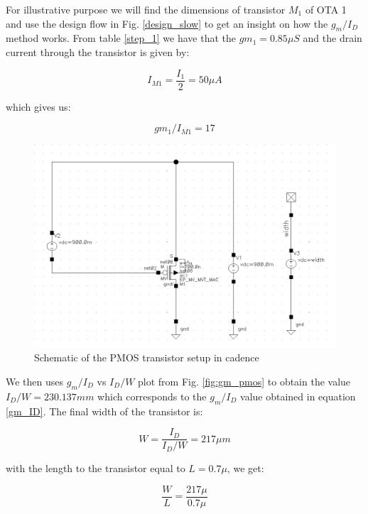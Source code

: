 For illustrative purpose we will find the dimensions of transistor $M_1$ of OTA 1 and use the design flow in Fig. \ref{design_slow} to get an insight on how the $g_m/I_D$ method works. From table \ref{step_1} we have that the $gm_1 = 0.85\mu S$ and the drain current through the transistor is given by:

\begin{equation}
    I_{M1} = \frac{I_1}{2} = 50\mu A
\end{equation}

which gives us:

\begin{equation}\label{gm_ID}
   gm_1/I_{M1} = 17 
\end{equation}



\begin{figure}[H]
\centering
\includegraphics[scale = 0.45]{images/gm_id_pmos_schem.png}
\caption{Schematic of the PMOS transistor setup in cadence}
\label{pmos_setup}
\end{figure}

We then uses $g_m/I_D$ vs $I_D/W$ plot from Fig. \ref{fig:gm_pmos} to obtain the value $I_D/W = 230.137mm$ which corresponds to the $g_m/I_D$ value obtained in equation \ref{gm_ID}. The final width of the transistor is:

\begin{equation}
    W = \frac{I_D}{I_D/W} = 217\mu m
\end{equation}

with the length to the transistor equal to $L = 0.7\mu$, we get:

\begin{equation}
\frac{W}{L} = \frac{217\mu}{0.7\mu} 
\end{equation}


